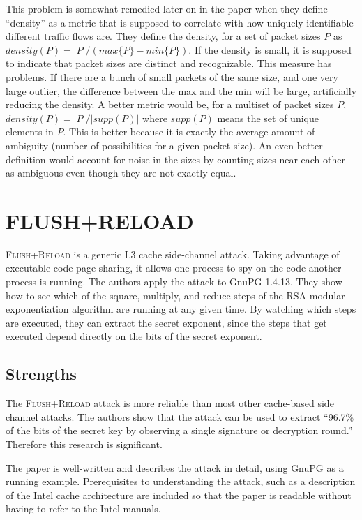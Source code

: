 \documentclass{acm_proc_article-sp}
\begin{document}
This problem is somewhat remedied later on in the paper when they define
``density'' as a metric that is supposed to correlate with how uniquely
identifiable different traffic flows are. They define the density, for a set of
packet sizes $P$ as $density(P) = |P| / (max\{P\} - min\{P\})$. If the density
is small, it is supposed to indicate that packet sizes are distinct and
recognizable. This measure has problems. If there are a bunch of small packets
of the same size, and one very large outlier, the difference between the max and
the min will be large, artificially reducing the density. A better metric would
be, for a multiset of packet sizes $P$, $density(P) = |P| / |supp(P)|$ where
$supp(P)$ means the set of unique elements in $P$. This is better because it is
exactly the average amount of ambiguity (number of possibilities for a given
packet size). An even better definition would account for noise in the sizes by
counting sizes near each other as ambiguous even though they are not exactly
equal. 

\section{FLUSH+RELOAD}

\textsc{Flush+Reload} \cite{yarom2013flush} is a generic L3 cache side-channel
attack. Taking advantage of executable code page sharing, it allows one process
to spy on the code another process is running. The authors apply the attack to
GnuPG 1.4.13. They show how to see which of the square, multiply, and reduce
steps of the RSA modular exponentiation algorithm are running at any given time.
By watching which steps are executed, they can extract the secret exponent,
since the steps that get executed depend directly on the bits of the secret
exponent.

\subsection{Strengths}

The \textsc{Flush+Reload} attack is more reliable than most other cache-based
side channel attacks. The authors show that the attack can be used to extract
``96.7\% of the bits of the secret key by observing a single signature or
decryption round.'' Therefore this research is significant.

The paper is well-written and describes the attack in detail, using GnuPG as
a running example. Prerequisites to understanding the attack, such as
a description of the Intel cache architecture are included so that the paper is
readable without having to refer to the Intel manuals.
\end{document}
